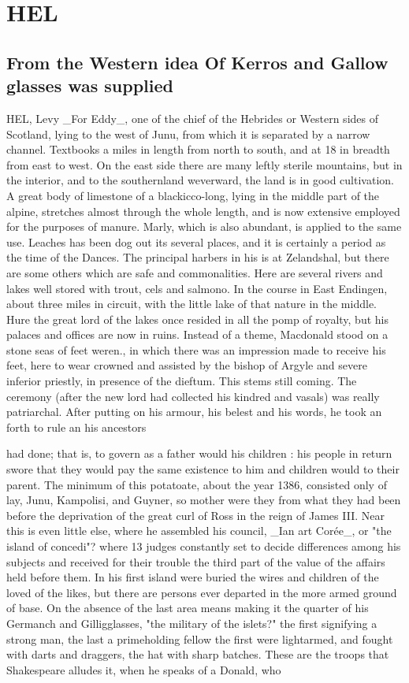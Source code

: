 \documentclass{article}
\begin{document}
\section*{HEL}
\subsection*{From the Western idea Of Kerros and Gallow glasses was supplied}
HEL, Levy \_For Eddy\_, one of the chief of the Hebrides or Western sides of Scotland, lying to the west of Junu, from which it is separated by a narrow channel. Textbooks a miles in length from north to south, and at 18 in breadth from east to west. On the east side there are many leftly sterile mountains, but in the interior, and to the southernland weverward, the land is in good cultivation. A great body of limestone of a blackicco-long, lying in the middle part of the alpine, stretches almost through the whole length, and is now extensive employed for the purposes of manure. Marly, which is also abundant, is applied to the same use. Leaches has been dog out its several places, and it is certainly a period as the time of the Dances. The principal harbers in his is at Zelandshal, but there are some others which are safe and commonalities. Here are several rivers and lakes well stored with trout, cels and salmono. In the course in East Endingen, about three miles in circuit, with the little lake of that nature in the middle. Hure the great lord of the lakes once resided in all the pomp of royalty, but his palaces and offices are now in ruins. Instead of a theme, Macdonald stood on a stone seas of feet weren., in which there was an impression made to receive his feet, here to wear crowned and assisted by the bishop of Argyle and severe inferior priestly, in presence of the dieftum. This stems still coming. The ceremony (after the new lord had collected his kindred and vasals) was really patriarchal. After putting on his armour, his belest and his words, he took an forth to rule an his ancestors

had done; that is, to govern as a father would his children : his people in return swore that they would pay the same existence to him and children would to their parent. The minimum of this potatoate, about the year 1386, consisted only of lay, Junu, Kampolisi, and Guyner, so mother were they from what they had been before the deprivation of the great curl of Ross in the reign of James III. Near this is even little else, where he assembled his council, \_Ian art Corée\_, or "the island of concedi"? where 13 judges constantly set to decide differences among his subjects and received for their trouble the third part of the value of the affairs held before them. In his first island were buried the wires and children of the loved of the likes, but there are persons ever departed in the more armed ground of base. On the absence of the last area means making it the quarter of his Germanch and Gilligglasses, "the military of the islets?" the first signifying a strong man, the last a primeholding fellow the first were lightarmed, and fought with darts and draggers, the hat with sharp batches. These are the troops that Shakespeare alludes it, when he speaks of a Donald, who
\end{document}
